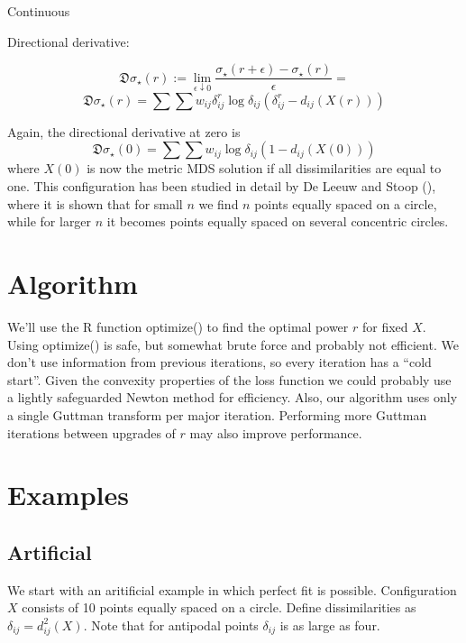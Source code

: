 \documentclass[
  12pt,
  letterpaper,
  DIV=11,
  numbers=noendperiod]{scrartcl}
\newcommand{\sectionbreak}{\clearpage}
\begin{document}
Continuous

Directional derivative:

\[
\mathfrak{D}\sigma_\star(r):=\lim_{\epsilon\downarrow 0}\frac{\sigma_\star(r+\epsilon)-\sigma_\star(r)}{\epsilon}=
\] \[
\mathfrak{D}\sigma_\star(r)=\sum\sum w_{ij}\delta_{ij}^r\log\delta_{ij}(\delta_{ij}^r-d_{ij}(X(r)))
\]

Again, the directional derivative at zero is \[
\mathfrak{D}\sigma_\star(0)=\sum\sum w_{ij}\log\delta_{ij}(1-d_{ij}(X(0)))
\] where \(X(0)\) is now the metric MDS solution if all dissimilarities
are equal to one. This configuration has been studied in detail by De
Leeuw and Stoop (), where it is
shown that for small \(n\) we find \(n\) points equally spaced on a
circle, while for larger \(n\) it becomes points equally spaced on
several concentric circles.

\sectionbreak

\section{Algorithm}\label{algorithm}

We'll use the R function optimize() to find the optimal power \(r\) for
fixed \(X\). Using optimize() is safe, but somewhat brute force and
probably not efficient. We don't use information from previous
iterations, so every iteration has a ``cold start''. Given the convexity
properties of the loss function we could probably use a lightly
safeguarded Newton method for efficiency. Also, our algorithm uses only
a single Guttman transform per major iteration. Performing more Guttman
iterations between upgrades of \(r\) may also improve performance.

\sectionbreak

\section{Examples}\label{examples}

\subsection{Artificial}\label{artificial}

We start with an aritificial example in which perfect fit is possible.
Configuration \(X\) consists of 10 points equally spaced on a circle.
Define dissimilarities as \(\delta_{ij}=d_{ij}^2(X)\). Note that for
antipodal points \(\delta_{ij}\) is as large as four.
\end{document}
